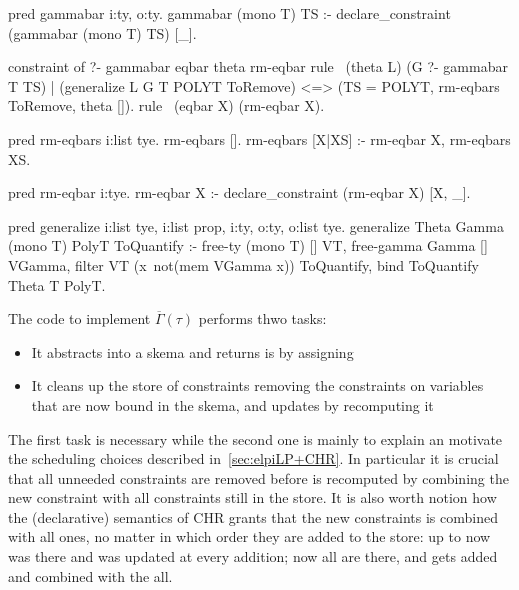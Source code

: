 \documentclass[a4paper, 11pt]{book}
\begin{document}
\begin{elpicode}
pred gammabar i:ty, o:ty.
gammabar (mono T) TS :- declare_constraint (gammabar (mono T) TS) [_].

constraint of ?- gammabar eqbar theta rm-eqbar {
  rule  \ (theta L)
          (G ?- gammabar T TS)     %
        | (generalize L G T POLYT ToRemove) %
      <=> (TS = POLYT, rm-eqbars ToRemove, theta []).             %
  rule \ (eqbar X) (rm-eqbar X).
}

pred rm-eqbars i:list tye.
rm-eqbars [].
rm-eqbars [X|XS] :- rm-eqbar X, rm-eqbars XS.

pred rm-eqbar i:tye.
rm-eqbar X :- declare_constraint (rm-eqbar X) [X, _].

pred generalize i:list tye, i:list prop, i:ty, o:ty, o:list tye.
generalize Theta Gamma (mono T) PolyT ToQuantify :-
  free-ty (mono T) [] VT,
  free-gamma Gamma [] VGamma,
  filter VT (x\ not(mem VGamma x)) ToQuantify,
  bind ToQuantify Theta T PolyT.
\end{elpicode}

The code to implement $\overline{\Gamma}(\tau)$ performs thwo tasks:

\begin{itemize}
  \item It abstracts  into a skema  and
    returns is by assigning 
  \item It cleans up the store of constraints removing the 
    constraints on variables that are now bound in the skema, and updates
     by recomputing it
\end{itemize}

The first task is necessary while the second one is mainly to explain an motivate
the scheduling choices described in~\ref{sec:elpiLP+CHR}. In particular it is crucial
that all unneeded  constraints are removed before
 is recomputed by combining the new constraint with all
 constraints still in the store. It is also worth notion how
the (declarative) semantics of CHR grants that the new 
constraints is combined with all  ones, no matter in
which order they are added to the store: up to now  was
there and was updated at every  addition; now all
 are there, and  gets added and combined
with the all.
\end{document}
